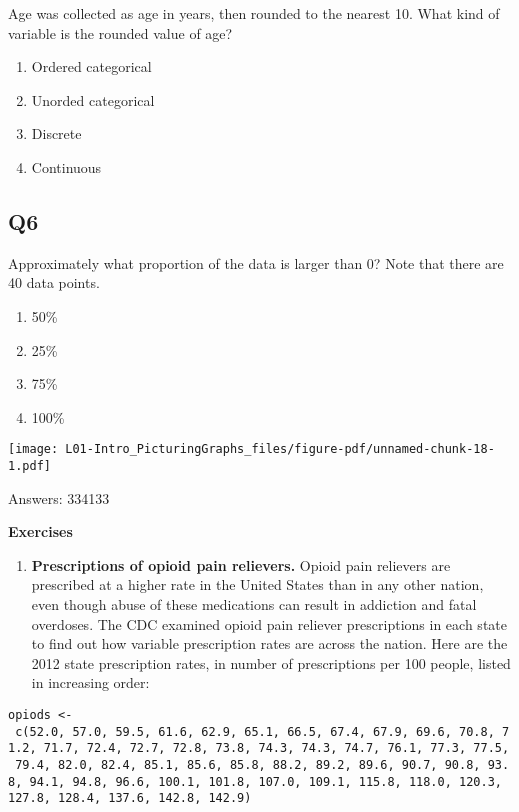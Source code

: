 \documentclass[
  letterpaper,
  DIV=11,
  numbers=noendperiod]{scrreprt}
\providecommand{\tightlist}{%
  \setlength{\itemsep}{0pt}\setlength{\parskip}{0pt}}\usepackage{longtable,booktabs,array}
\begin{document}
Age was collected as age in years, then rounded to the nearest 10. What
kind of variable is the rounded value of age?

\begin{enumerate}
\def\labelenumi{\arabic{enumi}.}
\tightlist
\item
  Ordered categorical
\item
  Unorded categorical
\item
  Discrete
\item
  Continuous
\end{enumerate}

\hypertarget{q6}{%
\subsection{Q6}\label{q6}}

\vspace{1cm}

Approximately what proportion of the data is larger than 0? Note that
there are 40 data points.

\begin{enumerate}
\def\labelenumi{\arabic{enumi}.}
\tightlist
\item
  50\%
\item
  25\%
\item
  75\%
\item
  100\%
\end{enumerate}

\texttt{[image: L01-Intro\_PicturingGraphs\_files/figure-pdf/unnamed-chunk-18-1.pdf]}

Answers: 334133

\textbf{Exercises}

\begin{enumerate}
\def\labelenumi{\arabic{enumi}.}
\tightlist
\item
  \textbf{Prescriptions of opioid pain relievers.} Opioid pain relievers
  are prescribed at a higher rate in the United States than in any other
  nation, even though abuse of these medications can result in addiction
  and fatal overdoses. The CDC examined opioid pain reliever
  prescriptions in each state to find out how variable prescription
  rates are across the nation. Here are the 2012 state prescription
  rates, in number of prescriptions per 100 people, listed in increasing
  order:
\end{enumerate}

\texttt{opiods\ \textless{}-\ c(52.0,\ 57.0,\ 59.5,\ 61.6,\ 62.9,\ 65.1,\ 66.5,\ 67.4,\ 67.9,\ 69.6,\ 70.8,\ 71.2,\ 71.7,\ 72.4,\ 72.7,\ 72.8,\ 73.8,\ 74.3,\ 74.3,\ 74.7,\ 76.1,\ 77.3,\ 77.5,\ 79.4,\ 82.0,\ 82.4,\ 85.1,\ 85.6,\ 85.8,\ 88.2,\ 89.2,\ 89.6,\ 90.7,\ 90.8,\ 93.8,\ 94.1,\ 94.8,\ 96.6,\ 100.1,\ 101.8,\ 107.0,\ 109.1,\ 115.8,\ 118.0,\ 120.3,\ 127.8,\ 128.4,\ 137.6,\ 142.8,\ 142.9)}
\end{document}
